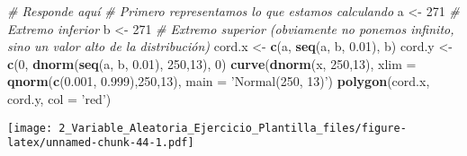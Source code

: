 \documentclass[
]{article}
\newenvironment{Shaded}{\begin{snugshade}}{\end{snugshade}}
\newcommand{\CommentTok}[1]{\textcolor[rgb]{0.56,0.35,0.01}{\textit{#1}}}
\newcommand{\DataTypeTok}[1]{\textcolor[rgb]{0.13,0.29,0.53}{#1}}
\newcommand{\DecValTok}[1]{\textcolor[rgb]{0.00,0.00,0.81}{#1}}
\newcommand{\FloatTok}[1]{\textcolor[rgb]{0.00,0.00,0.81}{#1}}
\newcommand{\KeywordTok}[1]{\textcolor[rgb]{0.13,0.29,0.53}{\textbf{#1}}}
\newcommand{\NormalTok}[1]{#1}
\newcommand{\StringTok}[1]{\textcolor[rgb]{0.31,0.60,0.02}{#1}}
\begin{document}
\begin{Shaded}
\begin{Highlighting}[]
\CommentTok{# Responde aquí}
\CommentTok{# Primero representamos lo que estamos calculando}
\NormalTok{a <-}\StringTok{ }\DecValTok{271} \CommentTok{# Extremo inferior}
\NormalTok{b <-}\StringTok{ }\DecValTok{271} \CommentTok{# Extremo superior (obviamente no ponemos infinito, sino un valor alto de la distribución)}
\NormalTok{cord.x <-}\StringTok{ }\KeywordTok{c}\NormalTok{(a, }\KeywordTok{seq}\NormalTok{(a, b, }\FloatTok{0.01}\NormalTok{), b) }
\NormalTok{cord.y <-}\StringTok{ }\KeywordTok{c}\NormalTok{(}\DecValTok{0}\NormalTok{, }\KeywordTok{dnorm}\NormalTok{(}\KeywordTok{seq}\NormalTok{(a, b, }\FloatTok{0.01}\NormalTok{), }\DecValTok{250}\NormalTok{,}\DecValTok{13}\NormalTok{), }\DecValTok{0}\NormalTok{) }
\KeywordTok{curve}\NormalTok{(}\KeywordTok{dnorm}\NormalTok{(x, }\DecValTok{250}\NormalTok{,}\DecValTok{13}\NormalTok{), }\DataTypeTok{xlim =} \KeywordTok{qnorm}\NormalTok{(}\KeywordTok{c}\NormalTok{(}\FloatTok{0.001}\NormalTok{, }\FloatTok{0.999}\NormalTok{),}\DecValTok{250}\NormalTok{,}\DecValTok{13}\NormalTok{), }\DataTypeTok{main =} \StringTok{'Normal(250, 13)'}\NormalTok{) }
\KeywordTok{polygon}\NormalTok{(cord.x, cord.y, }\DataTypeTok{col =} \StringTok{'red'}\NormalTok{)}
\end{Highlighting}
\end{Shaded}

\texttt{[image: 2\_Variable\_Aleatoria\_Ejercicio\_Plantilla\_files/figure-latex/unnamed-chunk-44-1.pdf]}
\end{document}
